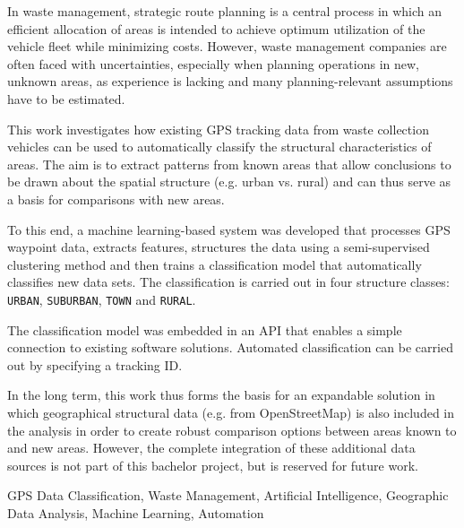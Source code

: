 \documentclass[a4paper,12pt,twoside]{scrreprt}
\begin{document}


In waste management, strategic route planning is a central
process in which an efficient allocation of areas is intended to achieve
optimum
utilization of the vehicle fleet while minimizing costs. However, waste
management companies are often faced with uncertainties, especially when
planning operations in new, unknown areas, as
experience is lacking and many planning-relevant assumptions have to be
estimated.

This work investigates how existing GPS tracking data from
waste collection vehicles can be used to automatically classify the structural
characteristics of
areas. The aim is to extract
patterns from known areas that allow conclusions to be drawn about the spatial
structure (e.g.
urban vs. rural) and can thus serve as a basis for comparisons with new
areas.

To this end, a machine learning-based system was developed that processes
GPS waypoint data, extracts features, structures the data using a
semi-supervised clustering method and then trains a
classification model that automatically classifies new data sets. The
classification is carried out in four structure classes: \texttt{URBAN},
\texttt{SUBURBAN}, \texttt{TOWN} and \texttt{RURAL}.

The classification model was embedded in an API that enables a simple
connection to existing software solutions. Automated classification can be
carried out by specifying a
tracking ID.

In the long term, this work thus forms the basis for an expandable
solution in which geographical structural data (e.g. from OpenStreetMap) is
also included in
the analysis in order to create robust comparison options between areas known
to
and new areas. However, the complete integration of these
additional data sources is not part of this bachelor project,
but is reserved for future work.
\vspace{0.5cm}

\noindent
GPS Data Classification, Waste Management, Artificial Intelligence, Geographic
Data Analysis, Machine Learning, Automation
\end{document}
